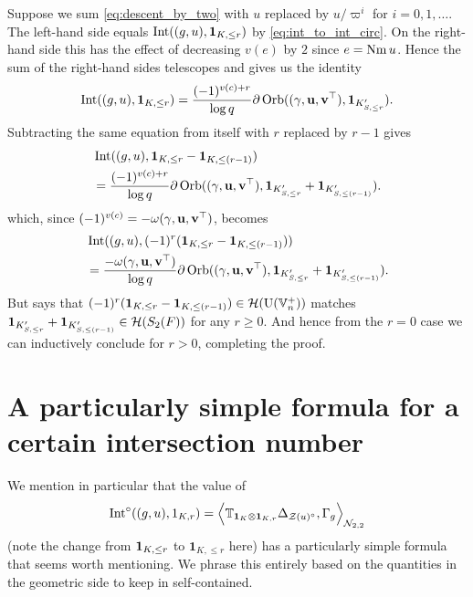 Suppose we sum \eqref{eq:descent_by_two} with $u$ replaced by
$u/\varpi^i$ for $i = 0, 1, \dots$.
The left-hand side equals $\operatorname{Int}((g,u), \mathbf{1}_{K, \le r})$ by \eqref{eq:int_to_int_circ}.
On the right-hand side this has the effect of decreasing $v(e)$ by $2$ since $e = \operatorname{Nm} u$.
Hence the sum of the right-hand sides telescopes and gives us the identity
\begin{equation}
  \operatorname{Int}((g,u), \mathbf{1}_{K, \le r})
  = \frac{(-1)^{v(c)+r}}{\log q}
    \partial\operatorname{Orb}({(\gamma, \mathbf u, \mathbf v^\top)}, \mathbf{1}_{K'_{S, \le r}}).
  \label{eq:match_penultimate}
\end{equation}
Subtracting the same equation from itself with $r$ replaced by $r-1$ gives
\begin{align*}
  &\operatorname{Int}((g,u), \mathbf{1}_{K, \le r} - \mathbf{1}_{K, \le (r-1)}) \\
  &= \frac{(-1)^{v(c)+r}}{\log q}
    \partial \operatorname{Orb}({(\gamma, \mathbf u, \mathbf v^\top)}, \mathbf{1}_{K'_{S, \le r}} + \mathbf{1}_{K'_{S, \le (r-1)}}).
\end{align*}
which, since $(-1)^{v(c)} = -\omega{(\gamma, \mathbf u, \mathbf v^\top)}$, becomes
\begin{equation}
  \begin{aligned}
    &\operatorname{Int}((g,u), (-1)^r(\mathbf{1}_{K, \le r} - \mathbf{1}_{K, \le (r-1)})) \\
    &= \frac{-\omega{(\gamma, \mathbf u, \mathbf v^\top)}}{\log q}
    \partial \operatorname{Orb}({(\gamma, \mathbf u, \mathbf v^\top)}, \mathbf{1}_{K'_{S, \le r}} + \mathbf{1}_{K'_{S, \le (r-1)}}).
  \end{aligned}
  \label{eq:match_final}
\end{equation}
But  says that
$(-1)^r(\mathbf{1}_{K, \le r} - \mathbf{1}_{K, \le (r-1)}) \in \mathcal H(\operatorname{U}(\mathbb V_n^+))$
matches $\mathbf{1}_{K'_{S, \le r}} + \mathbf{1}_{K'_{S, \le (r-1)}} \in \mathcal H(S_2(F))$
for any $r \ge 0$.
And hence from the $r = 0$ case we can inductively conclude
 for $r > 0$, completing the proof.

\section{A particularly simple formula for a certain intersection number}
We mention in particular that the value of
\[ \operatorname{Int}^\circ((g,u), 1_{K,r})
  = \Big\langle \mathbb{T}_{\mathbf{1}_K \otimes \mathbf{1}_{K, r}}
    \Delta_{\mathcal Z(u)^\circ}, \Gamma_g \Big\rangle_{\mathcal N_{2,2}} \]
(note the change from $\mathbf{1}_{K, \le r}$ to $\mathbf{1}_{K, \le r}$ here)
has a particularly simple formula that seems worth mentioning.
We phrase this entirely based on the quantities in the geometric side
to keep in self-contained.

